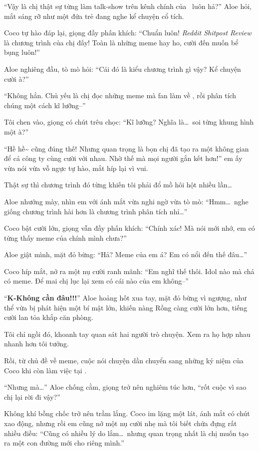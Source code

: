 \documentclass[../main.tex]{subfiles}
\begin{document}
``Vậy là chị thật sự từng làm talk-show trên kênh chính của \hll\ luôn hả?'' Aloe hỏi, mắt sáng rỡ như một đứa trẻ đang nghe kể chuyện cổ tích.

Coco tự hào đáp lại, giọng đầy phấn khích: ``Chuẩn luôn! \textit{Reddit Shitpost Review} là chương trình của chị đấy! Toàn là những meme hay ho, cười đến muốn bể bụng luôn!''

Aloe nghiêng đầu, tò mò hỏi: ``Cái đó là kiểu chương trình gì vậy? Kể chuyện cười à?''

``Không hẳn. Chủ yếu là chị đọc những meme mà fan làm về \hll, rồi phân tích chúng một cách kĩ lưỡng--''

Tôi chen vào, giọng có chút trêu chọc: ``Kĩ lưỡng? Nghĩa là\dots\ soi từng khung hình một à?''

``Hề hề\~{} cũng đúng thế! Nhưng quan trọng là bọn chị đã tạo ra một không gian để cả công ty cùng cười với nhau. Nhờ thế mà mọi người gắn kết hơn!'' em ấy vừa nói vừa vỗ ngực tự hào, mắt híp lại vì vui.

Thật sự thì chương trình đó từng khiến tôi phải đổ mồ hôi hột nhiều lần\dots

Aloe nhướng mày, nhìn em với ánh mắt vừa nghi ngờ vừa tò mò: ``Hmm\dots\ nghe giống chương trình hài hơn là chương trình phân tích nhỉ\dots''

Coco bật cười lớn, giọng vẫn đầy phấn khích: ``Chính xác! Mà nói mới nhớ, em có từng thấy meme của chính mình chưa?''

Aloe giật mình, mặt đỏ bừng: ``Hả? Meme của em á? Em có nổi đến thế đâu\dots''

Coco híp mắt, nở ra một nụ cười ranh mãnh: ``Em nghĩ thế thôi. Idol nào mà chả có meme. Để mai chị lục lại xem có cái nào của em không--''

``\textbf{K-Không cần đâu!!!}'' Aloe hoảng hốt xua tay, mặt đỏ bừng vì ngượng, như thể vừa bị phát hiện một bí mật lớn, khiến nàng Rồng càng cười lớn hơn, tiếng cười lan tỏa khắp căn phòng.

Tôi chỉ ngồi đó, khoanh tay quan sát hai người trò chuyện. Xem ra họ hợp nhau nhanh hơn tôi tưởng.

Rồi, từ chủ đề về meme, cuộc nói chuyện dần chuyển sang những kỷ niệm của Coco khi còn làm việc tại \hll.

``Nhưng mà\dots'' Aloe chống cằm, giọng trở nên nghiêm túc hơn, ``rốt cuộc vì sao chị lại rời đi vậy?''

Không khí bỗng chốc trở nên trầm lắng. Coco im lặng một lát, ánh mắt có chút xao động, nhưng rồi em cũng nở một nụ cười nhẹ mà tôi biết chứa đựng rất nhiều điều: ``Cũng có nhiều lý do lắm\dots\ nhưng quan trọng nhất là chị muốn tạo ra một con đường mới cho riêng mình.''
\end{document}
